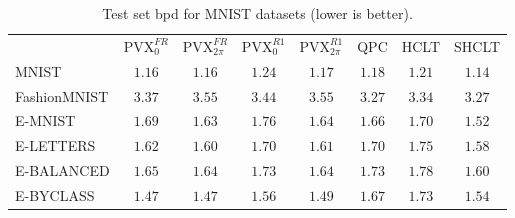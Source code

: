 \begin{table*}[t]
\centering
\caption{Test set bpd for MNIST datasets (lower is better).}
 \label{tab:mnist}
\begin{tabular}{lccccccc}
 & $\mathrm{PVX}_{0}^{FR}$ & $\mathrm{PVX}_{2\pi}^{FR}$ & $\mathrm{PVX}_{0}^{R1}$ & $\mathrm{PVX}_{2\pi}^{R1}$ & QPC & HCLT & SHCLT \\

\cmidrule(lr)
{2-5}\cmidrule(lr){6-8}
MNIST & $1.16$ & $1.16$ & $1.24$ & $1.17$ & $1.18$ & $1.21$ & $1.14$ \\
FashionMNIST & $3.37$ & $3.55$ & $3.44$ & $3.55$ & $3.27$ & $3.34$ & $3.27$ \\
E-MNIST & $1.69$ & $1.63$ & $1.76$ & $1.64$ & $1.66$ & $1.70$ & $1.52$ \\
E-LETTERS & $1.62$ & $1.60$ & $1.70$ & $1.61$ & $1.70$ & $1.75$ & $1.58$ \\
E-BALANCED & $1.65$ & $1.64$ & $1.73$ & $1.64$ & $1.73$ & $1.78$ & $1.60$ \\
E-BYCLASS & $1.47$ & $1.47$ & $1.56$ & $1.49$ & $1.67$ & $1.73$ & $1.54$ \\
\end{tabular}
\end{table*}
